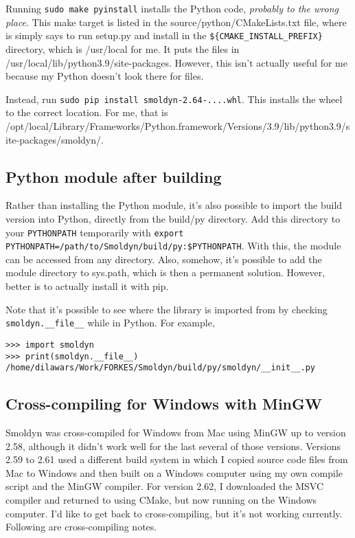 \documentclass {scrbook}
\newcommand {\ttt} {\texttt}
\begin{document}
Running \ttt{sudo make pyinstall} installs the Python code, \textit{probably to the wrong place}. This make target is listed in the source/python/CMakeLists.txt file, where is simply says to run setup.py and install in the \ttt{\$\{CMAKE\_INSTALL\_PREFIX\}} directory, which is /usr/local for me. It puts the files in /usr/local/lib/python3.9/site-packages. However, this isn't actually useful for me because my Python doesn't look there for files.

Instead, run \ttt{sudo pip install smoldyn-2.64-....whl}. This installs the wheel to the correct location. For me, that is /opt/local/Library/Frameworks/Python.framework/Versions/3.9/lib/python3.9/site-packages/smoldyn/.


\subsection{Python module after building}

Rather than installing the Python module, it's also possible to import the build version into Python, directly from the build/py directory. Add this directory to your \ttt{PYTHONPATH} temporarily with \ttt{export PYTHONPATH=/path/to/Smoldyn/build/py:\$PYTHONPATH}. With this, the module can be accessed from any directory. Also, somehow, it's possible to add the module directory to sys.path, which is then a permanent solution. However, better is to actually install it with pip.

Note that it's possible to see where the library is imported from by checking
\verb|smoldyn.__file__| while in Python. For example,

\begin{verbatim}
>>> import smoldyn
>>> print(smoldyn.__file__)
/home/dilawars/Work/FORKES/Smoldyn/build/py/smoldyn/__init__.py
\end{verbatim}


\subsection{Cross-compiling for Windows with MinGW}

Smoldyn was cross-compiled for Windows from Mac using MinGW up to version 2.58, although it didn't work well for the last several of those versions. Versions 2.59 to 2.61 used a different build system in which I copied source code files from Mac to Windows and then built on a Windows computer using my own compile script and the MinGW compiler. For version 2.62, I downloaded the MSVC compiler and returned to using CMake, but now running on the Windows computer. I'd like to get back to cross-compiling, but it's not working currently. Following are cross-compiling notes.
\end{document}
